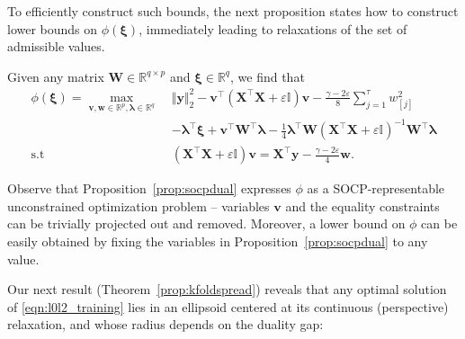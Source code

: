 \documentclass[mnsc,nonblindrev]{informs3} %
\newcommand{\ag}[1]{{\color{black}#1}}
\begin{document}
 To efficiently construct such bounds, the next proposition states how to construct lower bounds on $\phi(\bm{\xi})$, immediately leading to relaxations of the set of admissible values.

 \begin{proposition}\label{prop:socpdual}
Given any matrix $\bm{W}\in \mathbb{R}^{q\times p}$ and $\bm{\xi}\in \mathbb{R}^q$, we find that 
\begin{align*}
	\phi(\bm{\xi})=\max_{\bm{v}, \bm{w}\in \mathbb{R}^p,\bm{\lambda}\in \mathbb{R}^q}\;& \Vert \bm{y}\Vert_2^2-\bm{v}^\top \left(\bm{X}^\top \bm{X}+\varepsilon\mathbb{I}\right)\bm{v} - \frac{\gamma-2\varepsilon}{8} \sum_{j=1}^\tau w_{[j]}^2 \\
 & -\bm{\lambda}^\top \bm{\xi} + \bm{v}^\top \bm{W}^\top \bm{\lambda}-\frac{1}{4}\bm{\lambda}^\top \bm{W}\left(\bm{X}^\top \bm{X}+\varepsilon\mathbb{I}\right)^{-1}\bm{W}^\top\bm{\lambda}\\
 \text{s.t} \quad & \left(\bm{X}^\top \bm{X}+\varepsilon\mathbb{I}\right) \bm{v}=\bm{X}^\top \bm{y}-\frac{\gamma-2\varepsilon}{4}\bm{w}.
\end{align*}
 \end{proposition}
 Observe that Proposition~\ref{prop:socpdual} expresses $\phi$ as a SOCP-representable unconstrained optimization problem -- variables $\bm{v}$ and the equality constraints can be trivially projected out and removed. Moreover, a lower bound on $\phi$ can be easily obtained by fixing the variables in Proposition~\ref{prop:socpdual} to any value.

\fi

\ag{Our next result (Theorem~\ref{prop:kfoldspread}) reveals that any optimal solution of \eqref{eqn:l0l2_training} lies in an ellipsoid centered at its continuous (perspective) relaxation, and whose radius depends on the duality gap: %
}
\end{document}
